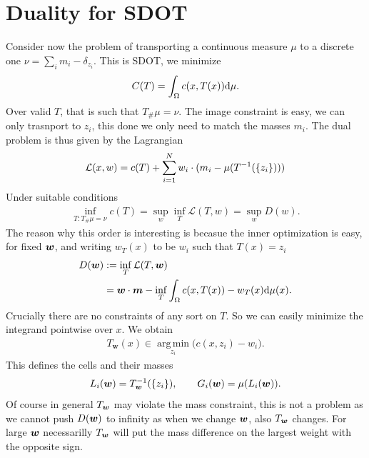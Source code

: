 \documentclass[
    a4paper,
    DIV=13,
    abstract=true,
    numbers=noenddot
]{scrartcl}
\begin{document}
\section{Duality for SDOT}
Consider now the problem of transporting a continuous measure $\mu$ to a discrete one $\nu = \sum_{i}m_i- \delta_{z_i} $. This is SDOT, we minimize
\begin{align*}
    C(T)= \int_{\Omega}c(x,T(x)) \mathrm{d} \mu. 
\end{align*}
Over valid $T$, that is such that $T_{\#}\mu= \nu$. The image constraint is easy, we can only trasnport to $z_i$, this done we only need to match the masses $m_i$. The dual problem is thus given by the Lagrangian
\begin{align*}
    \mathcal{L}(x,w)= c(T)+\sum_{i=1}^N w_i \cdot (m_i- \mu(T^{-1}(\left\{z_i\right\})))
\end{align*}
Under suitable conditions 
\begin{align*}
  \inf_{T: T_{\#}\mu=\nu} c(T)= \sup_w\inf_T\mathcal L(T,w)=\sup_w D(w).
\end{align*}
The reason why this order is interesting is becasue the inner optimization is easy, for fixed ${\bm{w}}$, and writing $w_T(x)$ to be $w_i$ such that $T(x)=z_i$ 
\begin{align*}
  D({\bm{w}})&:= \inf_T\mathcal L(T,{\bm{w}})\\&= {\bm{w}}\cdot {\bm{m}}-  \inf_T \int_{\Omega}c(x,T(x))- w_{T}(x) \mathrm{d} \mu(x).
\end{align*}
Crucially there are no constraints of any sort on $T$. So we can easily minimize the integrand pointwise over $x$. We obtain 
\begin{align*}
  T_{\bm{w}} (x)\in\operatorname*{arg\,min}_{z_i}\bigl(c(x,z_i)-w_i\bigr).
\end{align*}
This defines the cells and their masses 
\begin{align*}
  L_i({\bm{w}})= T_{\bm{w}}^{-1}(\left\{z_i\right\}), \qquad G_i ({\bm{w}})= \mu(L_i({\bm{w}})).
\end{align*}
Of course in general $T_{\bm{w}}$ may violate the mass constraint, this is not a problem as we cannot push $D({\bm{w}})$ to infinity as when we change ${\bm{w}}$, also $T_{\bm{w}}$ changes. For large ${\bm{w}}$ necessarilly $T_{\bm{w}}$ will put the mass difference on the largest weight with the opposite sign.
\end{document}
